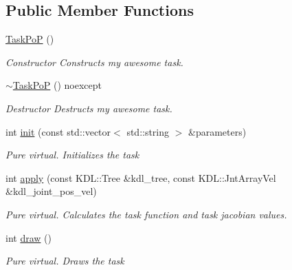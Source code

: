 \subsection*{Public Member Functions}
\begin{DoxyCompactItemize}
\item 
\hypertarget{classhiqp_1_1TaskPoP_a0d7d964d7cd4421897d7eaf1c16dfce9}{\hyperlink{classhiqp_1_1TaskPoP_a0d7d964d7cd4421897d7eaf1c16dfce9}{Task\-Po\-P} ()}\label{classhiqp_1_1TaskPoP_a0d7d964d7cd4421897d7eaf1c16dfce9}

\begin{DoxyCompactList}\small\item\em Constructor Constructs my awesome task. \end{DoxyCompactList}\item 
\hypertarget{classhiqp_1_1TaskPoP_ae8409bea63d95e02bd740e6aaa70b4fe}{\hyperlink{classhiqp_1_1TaskPoP_ae8409bea63d95e02bd740e6aaa70b4fe}{$\sim$\-Task\-Po\-P} () noexcept}\label{classhiqp_1_1TaskPoP_ae8409bea63d95e02bd740e6aaa70b4fe}

\begin{DoxyCompactList}\small\item\em Destructor Destructs my awesome task. \end{DoxyCompactList}\item 
int \hyperlink{classhiqp_1_1TaskPoP_a23279792f72d60c49a941be747d5a641}{init} (const std\-::vector$<$ std\-::string $>$ \&parameters)
\begin{DoxyCompactList}\small\item\em {\itshape Pure virtual}. Initializes the task \end{DoxyCompactList}\item 
int \hyperlink{classhiqp_1_1TaskPoP_a7f50f65c7e09492a0021715ad2ef2866}{apply} (const K\-D\-L\-::\-Tree \&kdl\-\_\-tree, const K\-D\-L\-::\-Jnt\-Array\-Vel \&kdl\-\_\-joint\-\_\-pos\-\_\-vel)
\begin{DoxyCompactList}\small\item\em {\itshape Pure virtual}. Calculates the task function and task jacobian values. \end{DoxyCompactList}\item 
int \hyperlink{classhiqp_1_1TaskPoP_a5e7a17a2371c5a3d28986c4cb4c09319}{draw} ()
\begin{DoxyCompactList}\small\item\em {\itshape Pure virtual}. Draws the task \end{DoxyCompactList}\end{DoxyCompactItemize}
